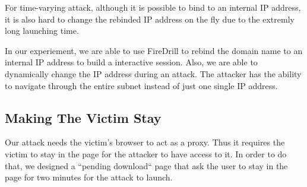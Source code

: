 For time-varying attack, although it is possible to bind to an internal IP address, it is also hard to change the rebinded IP address on the fly due to the extremly long launching time. 

In our experiement, we are able to use FireDrill to rebind the domain name to an internal IP address to build a interactive session. Also, we are able to dynamically change the IP address during an attack. The attacker has the ability to navigate through the entire subnet instead of just one single IP address.

\subsection{Making The Victim Stay}
Our attack needs the victim's browser to act as a proxy. Thus it requires the victim to stay in the page for the attacker to have access to it. In order to do that, we designed a ``pending download`` page that ask the user to stay in the page for two minutes for the attack to launch.
